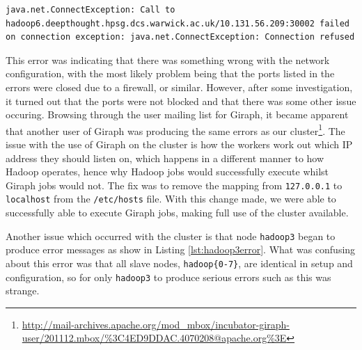 \begin{lstlisting}[float]
java.net.ConnectException: Call to hadoop6.deepthought.hpsg.dcs.warwick.ac.uk/10.131.56.209:30002 failed on connection exception: java.net.ConnectException: Connection refused
\end{lstlisting}

This error was indicating that there was something wrong with the network configuration, with the most likely problem being that the ports listed in the errors were closed due to a firewall, or similar. However, after some investigation, it turned out that the ports were not blocked and that there was some other issue occuring. Browsing through the user mailing list for Giraph, it became apparent that another user of Giraph was producing the same errors as our cluster\footnote{\url{http://mail-archives.apache.org/mod_mbox/incubator-giraph-user/201112.mbox/\%3C4ED9DDAC.4070208@apache.org\%3E}}. The issue with the use of Giraph on the cluster is how the workers work out which IP address they should listen on, which happens in a different manner to how Hadoop operates, hence why Hadoop jobs would successfully execute whilst Giraph jobs would not. The fix was to remove the mapping from {\tt 127.0.0.1} to {\tt localhost} from the {\tt /etc/hosts} file. With this change made, we were able to successfully able to execute Giraph jobs, making full use of the cluster available.

Another issue which occurred with the cluster is that node {\tt hadoop3} began to produce error messages as show in Listing \ref{lst:hadoop3error}. What was confusing about this error was that all slave nodes, {\tt hadoop\{0-7\}}, are identical in setup and configuration, so for only {\tt hadoop3} to produce serious errors such as this was strange.

